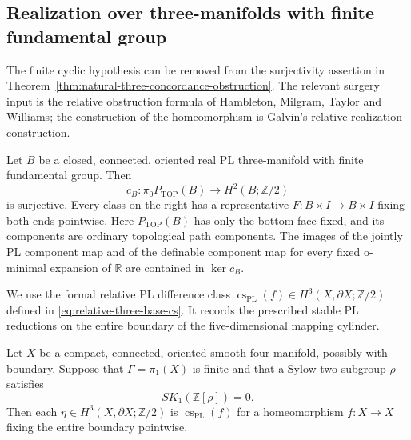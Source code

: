 \subsection{Realization over three-manifolds with finite fundamental group}

The finite cyclic hypothesis can be removed from the surjectivity
assertion in Theorem~\ref{thm:natural-three-concordance-obstruction}.
The relevant surgery input is the relative obstruction formula of
Hambleton, Milgram, Taylor and Williams; the construction of the
homeomorphism is Galvin's relative realization construction.

\begin{theorem}\label{thm:finite-three-concordance-realization}
Let $B$ be a closed, connected, oriented real PL three-manifold
with finite fundamental group.  Then
\[
 c_B:\pi_0P_{\mathrm{TOP}}(B)\longrightarrow
                         H^2(B;\mathbb Z/2)
\]
is surjective.  Every class on the right has a representative
$F:B\times I\to B\times I$ fixing both ends pointwise.
Here $P_{\mathrm{TOP}}(B)$ has only the bottom face fixed,
and its components are ordinary topological path components.
The images of the jointly PL component map and of the definable
component map for every fixed o-minimal expansion of
$\mathbb R$ are contained in $\ker c_B$.
\end{theorem}

We use the formal relative PL difference class
$\operatorname{cs}_{\mathrm{PL}}(f)\in
H^3(X,\partial X;\mathbb Z/2)$ defined in
\eqref{eq:relative-three-base-cs}.  It records the prescribed
stable PL reductions on the entire boundary of the
five-dimensional mapping cylinder.

\begin{lemma}\label{lem:finite-sylow-relative-cs-realization}
Let $X$ be a compact, connected, oriented smooth four-manifold,
possibly with boundary.  Suppose that $\Gamma=\pi_1(X)$ is finite
and that a Sylow two-subgroup $\rho$ satisfies
\[
                    SK_1(\mathbb Z[\rho])=0.
\]
Then each $\eta\in H^3(X,\partial X;\mathbb Z/2)$ is
$\operatorname{cs}_{\mathrm{PL}}(f)$ for a homeomorphism
$f:X\to X$ fixing the entire boundary pointwise.
\end{lemma}

